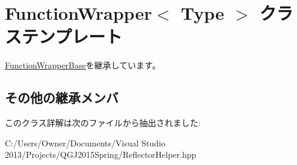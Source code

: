 \hypertarget{class_function_wrapper}{}\section{Function\+Wrapper$<$ Type $>$ クラステンプレート}
\label{class_function_wrapper}


\hyperlink{class_function_wrapper_base}{Function\+Wrapper\+Base}を継承しています。

\subsection*{その他の継承メンバ}


このクラス詳解は次のファイルから抽出されました\+:\begin{DoxyCompactItemize}
\item 
C\+:/\+Users/\+Owner/\+Documents/\+Visual Studio 2013/\+Projects/\+Q\+G\+J2015\+Spring/Reflector\+Helper.\+hpp\end{DoxyCompactItemize}
